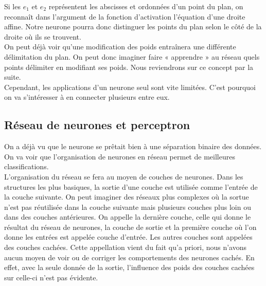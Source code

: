 Si les $e_1$ et $e_2$ représentent les abscisses et ordonnées d’un point du plan, on reconnaît dans l’argument de la fonction d’activation l’équation d’une droite affine. Notre neurone pourra donc distinguer les points du plan selon le côté de la droite où ils se trouvent.\\

On peut déjà voir qu’une modification des poids entraînera une différente délimitation du plan. On peut donc imaginer faire « apprendre » au réseau quels points délimiter en modifiant ses poids. Nous reviendrons sur ce concept par la suite.\\
Cependant, les applications d’un neurone seul sont vite limitées. C’est pourquoi on va s’intéresser à en connecter plusieurs entre eux.\\

\subsection{Réseau de neurones et perceptron} %
\label{sub:reseau_de_neurones}
On a déjà vu que le neurone se prêtait bien à une séparation binaire des données. On va voir que l’organisation de neurones en réseau permet de meilleures classifications.\\
L’organisation du réseau se fera au moyen de couches de neurones. 
Dans les structures les plus basiques, la sortie d'une couche est utilisée comme l'entrée de la couche suivante. On peut imaginer des réseaux plus complexes où la sortue n'est pas réutilisée dans la couche suivante mais plusieurs couches plus loin ou dans des couches antérieures.
On appelle la dernière couche, celle qui donne le résultat du réseau de neurones, la couche de sortie et la première couche où l'on donne les entrées est appelée couche d'entrée. Les autres couches sont appelées des couches cachées. Cette appellation vient du fait qu’a priori, nous n’avons aucun moyen de voir ou de corriger les comportements des neurones cachés. En effet, avec la seule donnée de la sortie, l’influence des poids des couches cachées sur celle-ci n'est pas évidente.\\


